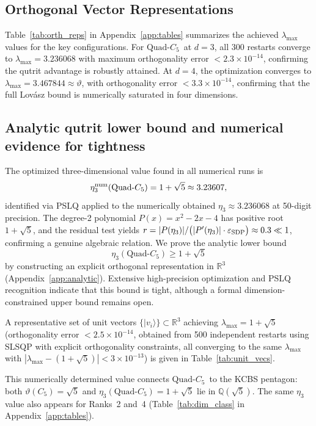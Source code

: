 \documentclass[aps,pra,twocolumn,superscriptaddress,longbibliography,floatfix]{revtex4-2}
\newcommand{\vt}{\vartheta}
\newcommand{\lmax}{\lambda_{\max}}
\newcommand{\QC}{\ensuremath{\text{Quad-}C_5}}
\begin{document}
\subsection{Orthogonal Vector Representations}

Table~\ref{tab:orth_reps} in Appendix~\ref{app:tables} summarizes the achieved $\lmax$ values for the
key configurations.
For \QC\ at $d=3$, all 300 restarts converge to $\lmax=3.236068$ with
maximum orthogonality error $<2.3\times10^{-14}$, confirming the qutrit
advantage is robustly attained.
At $d=4$, the optimization converges to $\lmax=3.467844\approx\vt$, with
orthogonality error $<3.3\times10^{-14}$, confirming that the full
Lov\'{a}sz bound is numerically saturated in four dimensions.

\subsection{Analytic qutrit lower bound and numerical evidence for tightness}

The optimized three-dimensional value found in all numerical runs is
\begin{equation}
  \eta_3^{\rm num}(\QC) = 1+\sqrt{5} \approx 3.23607,
  \label{eq:eta3_num}
\end{equation}
identified via PSLQ applied to the numerically obtained $\eta_3\approx3.236068$
at 50-digit precision.
The degree-2 polynomial $P(x)=x^2-2x-4$ has positive root $1+\sqrt{5}$, and
the residual test yields
$r=|P(\eta_3)|/\bigl(|P'(\eta_3)|\cdot\varepsilon_{\rm SDP}\bigr)\approx0.3\ll1$,
confirming a genuine algebraic relation.
We prove the analytic lower bound
\begin{equation}
  \eta_3(\QC) \geq 1+\sqrt{5}
  \label{eq:eta3_lb}
\end{equation}
by constructing an explicit orthogonal representation in $\mathbb{R}^3$
(Appendix~\ref{app:analytic}).
Extensive high-precision optimization and PSLQ recognition indicate that
this bound is tight, although a formal dimension-constrained upper bound
remains open.

A representative set of unit vectors $\{|v_i\rangle\}\subset\mathbb{R}^3$
achieving $\lmax=1+\sqrt{5}$ (orthogonality error $<2.5\times10^{-14}$,
obtained from 500 independent restarts using SLSQP with explicit orthogonality
constraints, all converging to the same $\lmax$ with
$|\lmax-(1+\sqrt{5})|<3\times10^{-13}$)
is given in Table~\ref{tab:unit_vecs}.

This numerically determined value connects \QC\ to the KCBS
pentagon: both $\vt(C_5)=\sqrt{5}$ and $\eta_3(\QC)=1+\sqrt{5}$
lie in $\mathbb{Q}(\sqrt{5})$.
The same $\eta_3$ value also appears for Ranks~2 and~4 (Table~\ref{tab:dim_class} in Appendix~\ref{app:tables}).
\end{document}
